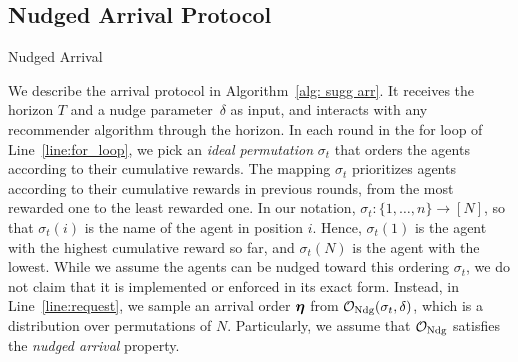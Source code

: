 \subsection{Nudged Arrival Protocol}\label{subsec:nudged prot}
\begin{algorithm}[t]
\caption{Nudged Arrival}
\label{alg: sugg arr}
\SetAlgoLined
\LinesNumbered
{} \label{line:input}
\end{algorithm}
We describe the arrival protocol in Algorithm~\ref{alg: sugg arr}. It receives the horizon $T$ and a nudge parameter~$\delta$ as input, and interacts with any recommender algorithm through the horizon. In each round in the for loop of Line~\ref{line:for_loop}, we pick an \textit{ideal permutation} $\sigma_t$ that orders the agents according to their cumulative rewards.  The mapping $\sigma_t$ prioritizes agents according to their cumulative rewards in previous rounds, from the most rewarded one to the least rewarded one. In our notation, $\sigma_t : \{1,\dots,n\} \to [N]$, so that $\sigma_t(i)$ is the name of the agent in position $i$. Hence, $\sigma_t(1)$ is the agent with the highest cumulative reward so far, and $\sigma_t(N)$ is the agent with the lowest. While we assume the agents can be nudged toward this ordering $\sigma_t$, we do not claim that it is implemented or enforced in its exact form. Instead, in Line~\ref{line:request}, we sample an arrival order $\boldsymbol{\eta}$ from   $\mathcal O_{\textnormal{Ndg}}(\sigma_t,\delta)$, which is a distribution over permutations of $N$. Particularly, we assume that $\mathcal O_{\textnormal{Ndg}}$ satisfies the \emph{nudged arrival} property.

